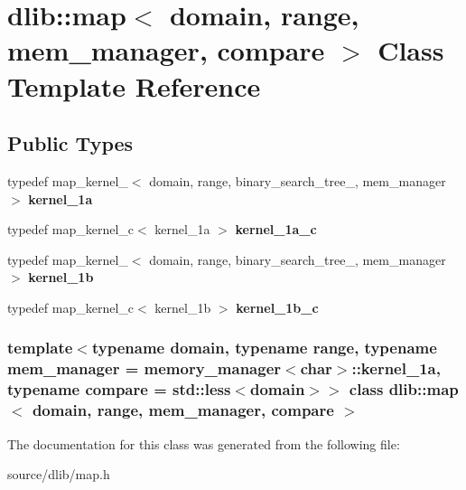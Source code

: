 \hypertarget{classdlib_1_1map}{
\section{dlib::map$<$ domain, range, mem\_\-manager, compare $>$ Class Template Reference}
\label{classdlib_1_1map}
}
\subsection*{Public Types}
\begin{DoxyCompactItemize}
\item 
\hypertarget{classdlib_1_1map_aca36b37bfe73286a57138fd644968555}{
typedef map\_\-kernel\_$<$ domain, range, binary\_\-search\_\-tree\_, mem\_\-manager $>$ {\bfseries kernel\_\-1a}}
\label{classdlib_1_1map_aca36b37bfe73286a57138fd644968555}

\item 
\hypertarget{classdlib_1_1map_ab24906726cac87d7a5499a7c6bf1595c}{
typedef map\_\-kernel\_\-c$<$ kernel\_\-1a $>$ {\bfseries kernel\_\-1a\_\-c}}
\label{classdlib_1_1map_ab24906726cac87d7a5499a7c6bf1595c}

\item 
\hypertarget{classdlib_1_1map_ae3e994e8e991bf4899ebad0e264ee5f5}{
typedef map\_\-kernel\_$<$ domain, range, binary\_\-search\_\-tree\_, mem\_\-manager $>$ {\bfseries kernel\_\-1b}}
\label{classdlib_1_1map_ae3e994e8e991bf4899ebad0e264ee5f5}

\item 
\hypertarget{classdlib_1_1map_a9121fd5c57bc2ae6b9acbbb74902087c}{
typedef map\_\-kernel\_\-c$<$ kernel\_\-1b $>$ {\bfseries kernel\_\-1b\_\-c}}
\label{classdlib_1_1map_a9121fd5c57bc2ae6b9acbbb74902087c}

\end{DoxyCompactItemize}
\subsubsection*{template$<$typename domain, typename range, typename mem\_\-manager = memory\_\-manager$<$char$>$::kernel\_\-1a, typename compare = std::less$<$domain$>$$>$ class dlib::map$<$ domain, range, mem\_\-manager, compare $>$}



The documentation for this class was generated from the following file:\begin{DoxyCompactItemize}
\item 
source/dlib/map.h\end{DoxyCompactItemize}
